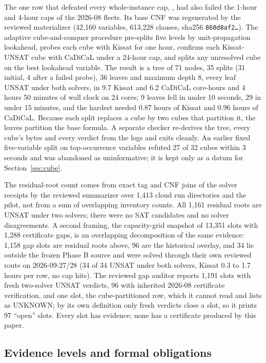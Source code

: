 \documentclass{anvil-paper}
\theoremstyle{definition}
\begin{document}
The one row that defeated every whole-instance cap, , had also failed the 1-hour and 4-hour caps of the 2026-08 fleets. Its base CNF was regenerated by the reviewed materializer (42,160 variables, 613,228 clauses, sha256 \texttt{860d8af2\ldots}). The adaptive cube-and-conquer procedure pre-splits five levels by unit-propagation lookahead, probes each cube with Kissat for one hour, confirms each Kissat-UNSAT cube with CaDiCaL under a 24-hour cap, and splits any unresolved cube on the best lookahead variable. The result is a tree of 71 nodes, 35 splits (31 initial, 4 after a failed probe), 36 leaves and maximum depth 8, every leaf UNSAT under both solvers, in 9.7 Kissat and 6.2 CaDiCaL core-hours and 4 hours 50 minutes of wall clock on 24 cores; 9 leaves fell in under 10 seconds, 29 in under 15 minutes, and the hardest needed 0.87 hours of Kissat and 0.96 hours of CaDiCaL. Because each split replaces a cube by two cubes that partition it, the leaves partition the base formula. A separate checker re-derives the tree, every cube's bytes and every verdict from the logs and exits cleanly. An earlier fixed five-variable split on top-occurrence variables refuted 27 of 32 cubes within 3 seconds and was abandoned as uninformative; it is kept only as a datum for Section~\ref{sec:cube}.

The residual-root count comes from exact tag and CNF joins of the solver receipts by the reviewed summarizer over 1,413 cloud run directories and the pilot, not from a sum of overlapping inventory counts. All 1,161 residual roots are UNSAT under two solvers; there were no SAT candidates and no solver disagreements. A second framing, the capacity-grid snapshot of 13,351 slots with 1,288 certificate gaps, is an overlapping decomposition of the same evidence: 1,158 gap slots are residual roots above, 96 are the historical overlay, and 34 lie outside the frozen Phase B source and were solved through their own reviewed route on 2026-09-27/28 (34 of 34 UNSAT under both solvers, Kissat 0.3 to 1.7 hours per row, no cap hits). The reviewed gap auditor reports 1,191 slots with fresh two-solver UNSAT verdicts, 96 with inherited 2026-08 certificate verification, and one slot, the cube-partitioned row, which it cannot read and lists as UNKNOWN; by its own definition only fresh verdicts close a slot, so it prints 97 ``open'' slots. Every slot has evidence; none has a certificate produced by this paper.

\subsection{Evidence levels and formal obligations}\label{sec:evidence}
\end{document}
